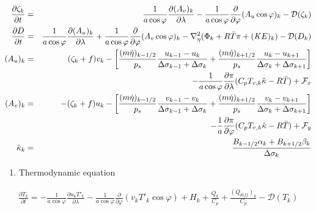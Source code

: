 \begin{eqnarray}
  \frac{\partial \zeta_k}{\partial t}
        &=&   \frac{1}{a\cos\varphi}
            \frac{\partial (A_v)_k}{\partial \lambda}
          - \frac{1}{a\cos\varphi}
            \frac{\partial }{\partial \varphi} (A_u \cos\varphi)_k
          - {\mathcal D}(\zeta_k) \\
  \frac{\partial D}{\partial t}
        &=&   \frac{1}{a\cos\varphi}
            \frac{\partial (A_u)_k}{\partial \lambda}
          + \frac{1}{a\cos\varphi}
            \frac{\partial }{\partial \varphi} (A_v \cos\varphi)_k
          - \nabla^{2}_{\eta}
           ( \Phi_k + R\bar{T} \pi
             + ({\mathit KE})_k )
          - {\mathcal D}(D_k) \\
  (A_u)_k
    &=&  ( \zeta_k + f ) v_k
             - \left[ \frac{(m\dot{\eta})_{k-1/2}}{p_s} \frac{u_{k-1} - u_k}{\Delta\sigma_{k-1}+\Delta\sigma_k}
               + \frac{(m\dot{\eta})_{k+1/2}}{p_s} \frac{u_k   - u_{k+1}}{\Delta\sigma_{k}+\Delta\sigma_{k+1}} \right] \notag\\
           &&- \frac{1}{a\cos\varphi} \frac{\partial \pi}{\partial \lambda}(C_p T_{v,k}\hat{\kappa}-R\bar{T})
             + {\mathcal F}_x \\
  (A_v)_k
    &=&  - ( \zeta_k + f ) u_k
             - \left[ \frac{(m\dot{\eta})_{k-1/2}}{p_s} \frac{v_{k-1} - v_k}{\Delta\sigma_{k-1}+\Delta\sigma_k}
               + \frac{(m\dot{\eta})_{k+1/2}}{p_s} \frac{v_k   - v_{k+1}}{\Delta\sigma_{k}+\Delta\sigma_{k+1}} \right] \notag\\
           &&- \frac{1}{a} \frac{\partial \pi}{\partial \varphi}(C_p T_{v,k}\hat{\kappa}-R\bar{T})
             + {\mathcal F}_y \\
   \hat{\kappa}_k
    &=& \frac{ B_{k-1/2} \alpha_k + B_{k+1/2} \beta_k }
            { \Delta\sigma_k                                  }  \end{eqnarray}

\begin{enumerate}
\def\labelenumi{\arabic{enumi}.}
\tightlist
\item
  Thermodynamic equation
\end{enumerate}

\begin{eqnarray}
  \frac{\partial T_k}{\partial t}
     =  - \frac{1}{a\cos\varphi}
               \frac{\partial u_k T'_k}{\partial \lambda}
          - \frac{1}{a\cos\varphi}
               \frac{\partial }{\partial \varphi} (v_k T'_k \cos\varphi)
          + H_k
        + \frac{Q_k}{C_{p}}
          + \frac{(Q_{diff})_k}{C_p}
          - {\mathcal D}(T_k)  \end{eqnarray}

